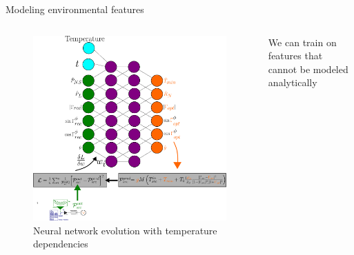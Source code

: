 \documentclass[aspectratio=169]{beamer}
\begin{document}
\begin{frame}{\small{Modeling environmental features}}
    \begin{columns}[c]
        \begin{column}{0.55\textwidth}
            \begin{figure}
                \centering
                \includegraphics[width=\textwidth]{images/nn_time_tpm.pdf}
                \caption{\tiny Neural network evolution with temperature
                dependencies}
            \end{figure}
        \end{column}
        \begin{column}{0.45\textwidth}
            \begin{tcolorbox}[colback=blue!5!white,colframe=blue!75!black,title=]
                We can train on features that cannot be modeled analytically
            \end{tcolorbox}
        \end{column}
    \end{columns}
\end{frame}
\end{document}
